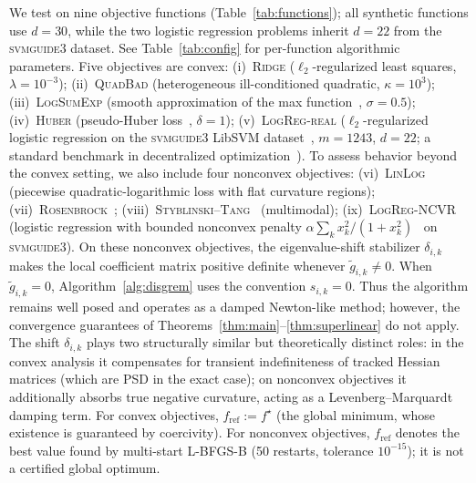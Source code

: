 \documentclass[review,onefignum,onetabnum]{siamart171218}
\begin{document}
	We test on nine objective functions
	(Table~\ref{tab:functions});
	all synthetic functions use $d{=}30$, while the two logistic regression
	problems inherit $d{=}22$ from the \textsc{svmguide3} dataset.
	See Table~\ref{tab:config} for per-function algorithmic parameters.
	Five objectives are convex:
	(i)~\textsc{Ridge} ($\ell_2$-regularized least squares, $\lambda{=}10^{-3}$);
	(ii)~\textsc{QuadBad} (heterogeneous ill-conditioned quadratic, $\kappa{=}10^3$);
	(iii)~\textsc{LogSumExp}
	(smooth approximation of the max function~\citep{nesterov2005smooth},
	$\sigma{=}0.5$);
	(iv)~\textsc{Huber}
	(pseudo-Huber loss~\citep{charbonnier1997huber}, $\delta{=}1$);
	(v)~\textsc{LogReg-real} ($\ell_2$-regularized logistic regression on the
	\textsc{svmguide3} LibSVM dataset~\citep{chang2011libsvm},
	$m{=}1243$, $d{=}22$;
	a standard benchmark in decentralized
	optimization~\citep{shi2015extra,sun2022sonata}).
	To assess behavior beyond the convex setting, we also include four
	nonconvex objectives:
	(vi)~\textsc{LinLog} (piecewise quadratic-logarithmic loss with flat curvature regions);
	(vii)~\textsc{Rosenbrock}~\citep{rosenbrock1960automatic};
	(viii)~\textsc{Styblinski--Tang}~\citep{styblinski1990experiments} (multimodal);
	(ix)~\textsc{LogReg-NCVR} (logistic regression with
	bounded nonconvex penalty $\alpha\sum_k x_k^2/(1{+}x_k^2)$~\citep{geman1995nonlinear}
	on \textsc{svmguide3}).
	On these nonconvex objectives, the eigenvalue-shift stabilizer
	$\delta_{i,k}$ makes the local coefficient matrix positive definite whenever
	$\tilde g_{i,k}\ne0$. When $\tilde g_{i,k}=0$, Algorithm~\ref{alg:disgrem}
	uses the convention $s_{i,k}=0$. Thus the algorithm remains well posed and operates as a
	damped Newton-like method; however, the convergence
	guarantees of Theorems~\ref{thm:main}--\ref{thm:superlinear} do
	not apply.
	The shift $\delta_{i,k}$ plays two structurally similar but
	theoretically distinct roles:
	in the convex analysis it compensates for transient indefiniteness of
	tracked Hessian matrices (which are PSD in the exact case);
	on nonconvex objectives it additionally absorbs true negative
	curvature, acting as a Levenberg--Marquardt damping term.
	For convex objectives, $f_{\mathrm{ref}}:=f^\star$ (the global minimum,
	whose existence is guaranteed by coercivity).
	For nonconvex objectives, $f_{\mathrm{ref}}$ denotes the best value
	found by multi-start L-BFGS-B (50 restarts, tolerance $10^{-15}$);
	it is not a certified global optimum.
	
\end{document}

